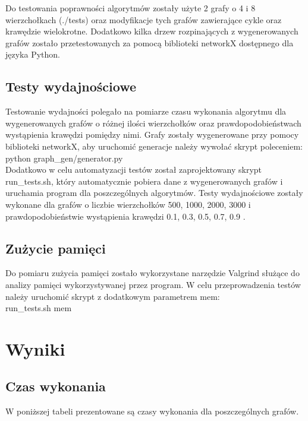 \documentclass[a4paper, 10pt]{article}
\begin{document}
Do testowania poprawności algorytmów zostały użyte 2 grafy o 4 i 8  wierzchołkach (./tests) oraz modyfikacje tych grafów
zawierające cykle oraz krawędzie wielokrotne. Dodatkowo kilka drzew rozpinających z wygenerowanych grafów zostało przetestowanych
za pomocą biblioteki networkX \cite{netx} dostępnego  dla języka Python.

\subsection{Testy wydajnościowe}

Testowanie wydajności polegało na pomiarze czasu wykonania algorytmu dla wygenerowanych grafów o różnej ilości wierzchołków oraz
prawdopodobieństwach wystąpienia krawędzi pomiędzy nimi. Grafy zostały wygenerowane przy pomocy biblioteki networkX, aby uruchomić generacje
należy wywołać skrypt poleceniem: \\
python graph\_gen/generator.py \\
Dodatkowo w celu automatyzacji testów został zaprojektowany skrypt run\_tests.sh, który automatycznie pobiera dane z wygenerowanych grafów
i uruchamia program dla poszczególnych algorytmów. Testy wydajnościowe zostały wykonane dla grafów o liczbie wierzchołków 500, 1000, 2000, 3000 i prawdopodobieństwie 
wystąpienia krawędzi 0.1, 0.3, 0.5, 0.7, 0.9 .
\hfill
\hfill


\subsection{Zużycie pamięci}

Do pomiaru zużycia pamięci zostało wykorzystane narzędzie Valgrind służące do analizy pamięci wykorzystywanej przez program.
W celu przeprowadzenia testów należy uruchomić skrypt z dodatkowym parametrem mem: \\
run\_tests.sh mem


\section{Wyniki}

\subsection{Czas wykonania}
W poniższej tabeli prezentowane są czasy wykonania dla poszczególnych grafów.
\end{document}
